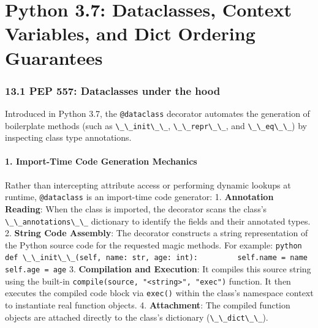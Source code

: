 \hypertarget{python-3.7-dataclasses-context-variables-and-dict-ordering-guarantees}{%
\chapter{Python 3.7: Dataclasses, Context Variables, and Dict Ordering
Guarantees}\label{python-3.7-dataclasses-context-variables-and-dict-ordering-guarantees}}

\hypertarget{pep-557-dataclasses-under-the-hood}{%
\subsection{13.1 PEP 557: Dataclasses under the
hood}\label{pep-557-dataclasses-under-the-hood}}

Introduced in Python 3.7, the \passthrough{\lstinline!@dataclass!}
decorator automates the generation of boilerplate methods (such as
\passthrough{\lstinline!\_\_init\_\_!},
\passthrough{\lstinline!\_\_repr\_\_!}, and
\passthrough{\lstinline!\_\_eq\_\_!}) by inspecting class type
annotations.

\hypertarget{import-time-code-generation-mechanics}{%
\subsubsection{1. Import-Time Code Generation
Mechanics}\label{import-time-code-generation-mechanics}}

Rather than intercepting attribute access or performing dynamic lookups
at runtime, \passthrough{\lstinline!@dataclass!} is an import-time code
generator: 1. \textbf{Annotation Reading}: When the class is imported,
the decorator scans the class's
\passthrough{\lstinline!\_\_annotations\_\_!} dictionary to identify the
fields and their annotated types. 2. \textbf{String Code Assembly}: The
decorator constructs a string representation of the Python source code
for the requested magic methods. For example:
\passthrough{\lstinline!python     def \_\_init\_\_(self, name: str, age: int):         self.name = name         self.age = age!}
3. \textbf{Compilation and Execution}: It compiles this source string
using the built-in
\passthrough{\lstinline!compile(source, "<string>", "exec")!} function.
It then executes the compiled code block via
\passthrough{\lstinline!exec()!} within the class's namespace context to
instantiate real function objects. 4. \textbf{Attachment}: The compiled
function objects are attached directly to the class's dictionary
(\passthrough{\lstinline!\_\_dict\_\_!}).

